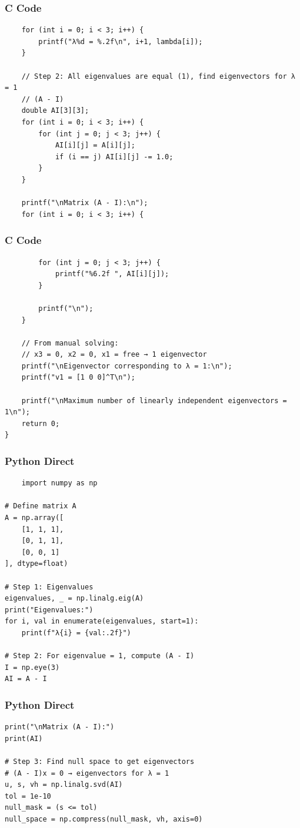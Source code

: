 \documentclass{beamer}
\begin{document}
\begin{frame}[fragile]
\frametitle{C Code}
\begin{lstlisting}
    for (int i = 0; i < 3; i++) {
        printf("λ%d = %.2f\n", i+1, lambda[i]);
    }

    // Step 2: All eigenvalues are equal (1), find eigenvectors for λ = 1
    // (A - I)
    double AI[3][3];
    for (int i = 0; i < 3; i++) {
        for (int j = 0; j < 3; j++) {
            AI[i][j] = A[i][j];
            if (i == j) AI[i][j] -= 1.0;
        }
    }

    printf("\nMatrix (A - I):\n");
    for (int i = 0; i < 3; i++) {
     \end{lstlisting}
    \end{frame}
\begin{frame}[fragile]
\frametitle{C Code}
\begin{lstlisting}
        for (int j = 0; j < 3; j++) {
            printf("%6.2f ", AI[i][j]);
        }
        
        printf("\n");
    }

    // From manual solving:
    // x3 = 0, x2 = 0, x1 = free → 1 eigenvector
    printf("\nEigenvector corresponding to λ = 1:\n");
    printf("v1 = [1 0 0]^T\n");

    printf("\nMaximum number of linearly independent eigenvectors = 1\n");
    return 0;
}

\end{lstlisting}
\end{frame}
\begin{frame}[fragile]
\frametitle{Python Direct}
\begin{lstlisting}
    import numpy as np

# Define matrix A
A = np.array([
    [1, 1, 1],
    [0, 1, 1],
    [0, 0, 1]
], dtype=float)

# Step 1: Eigenvalues
eigenvalues, _ = np.linalg.eig(A)
print("Eigenvalues:")
for i, val in enumerate(eigenvalues, start=1):
    print(f"λ{i} = {val:.2f}")

# Step 2: For eigenvalue = 1, compute (A - I)
I = np.eye(3)
AI = A - I
\end{lstlisting}
\end{frame}
\begin{frame}[fragile]
\frametitle{Python Direct}
\begin{lstlisting}
print("\nMatrix (A - I):")
print(AI)

# Step 3: Find null space to get eigenvectors
# (A - I)x = 0 → eigenvectors for λ = 1
u, s, vh = np.linalg.svd(AI)
tol = 1e-10
null_mask = (s <= tol)
null_space = np.compress(null_mask, vh, axis=0)
\end{lstlisting}
\end{frame}
\end{document}
